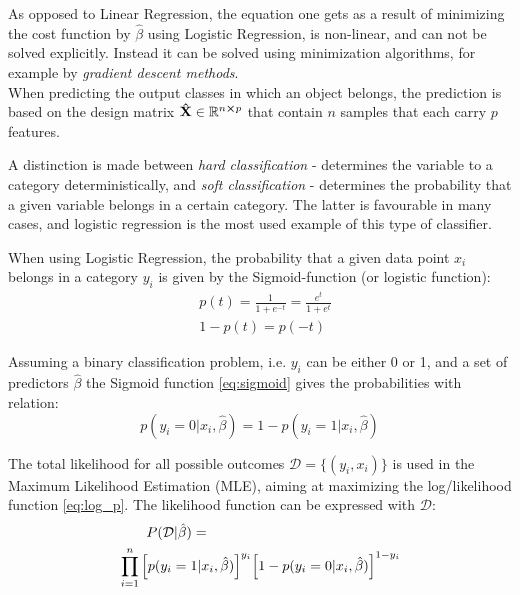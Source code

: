 As opposed to Linear Regression, the equation one gets as a result of minimizing the cost function by $\hat{\beta}$ using Logistic Regression, is non-linear, and can not be solved explicitly. Instead it can be solved using minimization algorithms, for example by \emph{gradient descent methods}. \\

When predicting the output classes in which an object belongs, the prediction is based on the design matrix $\mathbf{\hat{X}} \in \mathbb{R}^{n\cross p}$ that contain $n$ samples that each carry $p$ features.

A distinction is made between \textit{hard classification} -  determines the variable to a category deterministically, and \textit{soft classification} - determines the probability that a given variable belongs in a certain category. The latter is favourable in many cases, and logistic regression is the most used example of this type of classifier.

When using Logistic Regression, the probability that a given data point $x_i$ belongs in a category $y_i$ is given by the Sigmoid-function (or logistic function):
\begin{equation}
\begin{split}
    & p(t) = \frac{1}{1 + e^{-t}} = \frac{e^t}{1+e^t} \\
    & 1-p(t) = p(-t)
\end{split}
  \label{eq:sigmoid}
\end{equation}

Assuming a binary classification problem, i.e. $y_i$ can be either 0 or 1, and a set of predictors $\hat{\beta}$ the Sigmoid function \eqref{eq:sigmoid} gives the probabilities with relation:
\begin{equation*}
  p(y_i = 0|x_i,\hat{\beta})  = 1 - p(y_i = 1|x_i,\hat{\beta})
  \label{eq:prob_relation}
\end{equation*}

The total likelihood for all possible outcomes $\mathcal{D}=\{(y_i,x_i)\}$ is used in the Maximum Likelihood Estimation (MLE), aiming at maximizing the log/likelihood function \eqref{eq:log_p}. The likelihood function can be expressed with $\mathcal{D}$:
\begin{equation*}
\begin{split}
    &\qquad P(\mathcal{D}|\hat{\beta}) = \\
    &\prod_{i=1}^n \qty[p(y_i = 1|x_i,\hat{\beta}) ]^{y_i}  \qty[1 - p(y_i = 0|x_i,\hat{\beta})]^{1-y_i}
\end{split}
\end{equation*}

